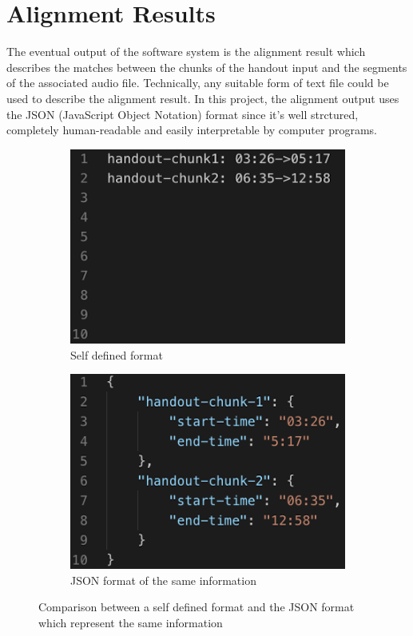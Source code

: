 \section{Alignment Results}
\label{sec:assume-align-res}

The eventual output of the software system is the alignment result which describes the matches between the chunks of the handout input and the segments of the associated audio file. Technically, any suitable form of text file could be used to describe the alignment result. In this project, the alignment output uses the JSON (JavaScript Object Notation) format since it's well strctured, completely human-readable and easily interpretable by computer programs.

\begin{figure}[!htb]
  \centering
  \begin{subfigure}{.45\textwidth}
    \includegraphics[width=\textwidth]{txt-example.png}
    \caption{Self defined format}
  \end{subfigure}
  \begin{subfigure}{.45\textwidth}
    \includegraphics[width=\textwidth]{json-example.png}
    \caption{JSON format of the same information}
  \end{subfigure}
  \caption{Comparison between a self defined format and the JSON format which represent the same information}
  \label{fig:txt-json-compare}
\end{figure}

